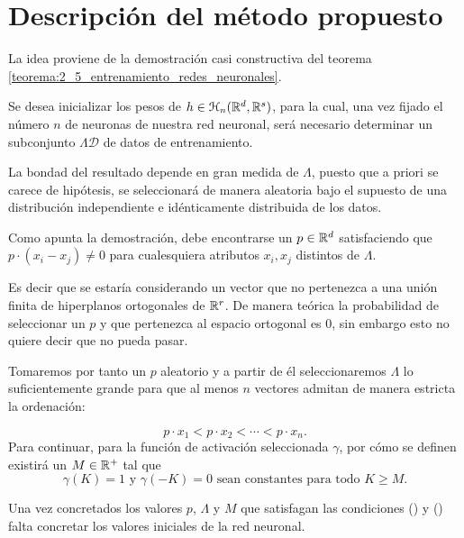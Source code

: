 \section{Descripción del método propuesto}

\begin{aportacionOriginal} %
    
La idea proviene de la demostración casi constructiva del teorema \ref{teorema:2_5_entrenamiento_redes_neuronales}.

Se desea inicializar los pesos de $h \in \mathcal{H}_n(\mathbb{R}^d,\mathbb{R}^s)$, para la cual, una vez fijado el número $n$ de neuronas de nuestra red neuronal, será necesario  determinar un subconjunto $\Lambda \mathcal{D}$ de datos de entrenamiento. 

La bondad del resultado depende en gran medida de $\Lambda$, 
puesto que a priori se carece de hipótesis, se seleccionará 
de manera aleatoria bajo el supuesto de una distribución 
independiente e idénticamente distribuida de los datos. 

Como apunta la demostración, debe encontrarse un 
$p \in \mathbb{R}^d$ satisfaciendo que $p \cdot (x_i-x_j) \neq 0$ para cualesquiera
atributos $x_i,x_j$ distintos de $\Lambda$.  

Es decir que se estaría considerando un vector que no 
pertenezca a una unión finita de hiperplanos ortogonales de $\mathbb{R}^r$. 
De manera teórica la probabilidad de seleccionar un $p$ y 
que pertenezca al espacio ortogonal es $0$, sin embargo esto 
no quiere decir que no pueda pasar. 

Tomaremos por tanto un $p$ aleatorio y a partir de él 
seleccionaremos $\Lambda$ lo suficientemente grande para que
 al menos $n$ vectores admitan de manera estricta la ordenación: 

\begin{equation}\label{eq:method_inicializar_condition_desigualdad}
    p \cdot x_1 < 
    p \cdot x_2 
    < \cdots <
    p \cdot x_n.
\end{equation}
Para continuar, para la función de activación 
seleccionada $\gamma$, por cómo se definen 
existirá un $M \in \mathbb{R}^+$ tal que 
\begin{equation} \label{eq:method_inicializar_M}
    \gamma(K)=1 \text{ y } \gamma(-K)=0 
    \text{ sean constantes para todo }K \geq M.
\end{equation}

Una vez concretados los valores $p$, $\Lambda$ y $M$ que satisfagan las condiciones 
() 
y ()  
falta concretar los valores iniciales de la red neuronal. 


\end{aportacionOriginal}
